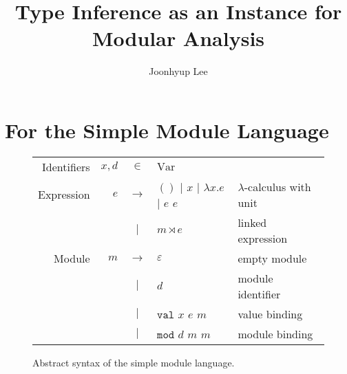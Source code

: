 \documentclass{article}
\title{Type Inference as an Instance for Modular Analysis}
\author{Joonhyup Lee}
\theoremstyle{definition}
\newcommand*{\vbar}{|}
\newcommand*{\ExprVar}{\text{Var}}
\newcommand*{\modid}{d}
\newcommand*{\link}[2]{{#1}\rtimes{#2}}
\newcommand*{\Lete}{\mathtt{val}}
\newcommand*{\Letm}{\mathtt{mod}}
\begin{document}
\maketitle
\section{For the Simple Module Language}
\begin{figure}[htb]
  \centering
  \begin{tabular}{rrcll}
    Identifiers & $x,\modid$ & $\in$         & $\ExprVar$                                                                            \\
    Expression  & $e$        & $\rightarrow$ & $()$ $\vbar$ $x$ $\vbar$ $\lambda x.e$ $\vbar$ $e$ $e$ & $\lambda$-calculus with unit \\
                &            & $\vbar$       & $\link{m}{e}$                                          & linked expression            \\
    Module      & $m$        & $\rightarrow$ & $\varepsilon$                                          & empty module                 \\
                &            & $\vbar$       & $\modid$                                               & module identifier            \\
                &            & $\vbar$       & $\Lete$ $x$ $e$ $m$                                    & value binding                \\
                &            & $\vbar$       & $\Letm$ $\modid$ $m$ $m$                               & module binding               \\
  \end{tabular}
  \caption{Abstract syntax of the simple module language.}
  \label{fig:syntax}
\end{figure}
\end{document}

